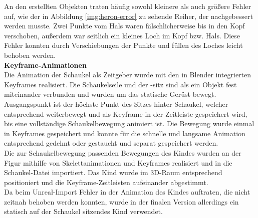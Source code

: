 \documentclass{Bericht}
\begin{document}
An den erstellten Objekten traten häufig sowohl kleinere als auch größere Fehler auf, wie der in Abbildung \ref{img:heron-error} zu sehende Reiher, der nachgebessert werden musste. Zwei Punkte vom Hals waren fälschlicherweise bis in den Kopf verschoben, außerdem war seitlich ein kleines Loch im Kopf bzw. Hals. Diese Fehler konnten durch Verschiebungen der Punkte und füllen des Loches leicht behoben werden.\\
			 
\textbf{Keyframe-Animationen}\\
Die Animation der Schaukel als Zeitgeber wurde mit den in Blender integrierten Keyframes realisiert. Die Schaukelseile und der -sitz sind als ein Objekt fest miteinander verbunden und wurden um das statische Gerüst bewegt. Ausgangspunkt ist der höchste Punkt des Sitzes hinter Schaukel, welcher entsprechend weiterbewegt und als Keyframe in der Zeitleiste gespeichert wird, bis eine vollständige Schaukelbewegung animiert ist. Die Bewegung wurde einmal in Keyframes gespeichert und konnte für die schnelle und langsame Animation entsprechend gedehnt oder gestaucht und separat gespeichert werden.\\
Die zur Schaukelbewegung passenden Bewegungen des Kindes wurden an der Figur mithilfe von Skelettanimationen und Keyframes realisiert und in die Schaukel-Datei importiert. Das Kind wurde im 3D-Raum entsprechend positioniert und die Keyframe-Zeitleisten aufeinander abgestimmt. \\
Da beim Unreal-Import Fehler in der Animation des Kindes auftraten, die nicht zeitnah behoben werden konnten, wurde in der finalen Version allerdings ein statisch auf der Schaukel sitzendes Kind verwendet. 
		
\end{document}
